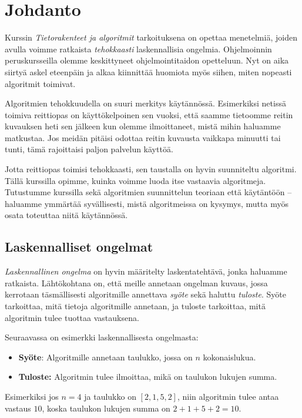 \chapter{Johdanto}

Kurssin \emph{Tietorakenteet ja algoritmit} tarkoituksena
on opettaa menetelmiä, joiden avulla voimme ratkaista
\emph{tehokkaasti} laskennallisia ongelmia.
Ohjelmoinnin peruskursseilla olemme keskittyneet
ohjelmointitaidon opetteluun.
Nyt on aika siirtyä askel eteenpäin ja alkaa kiinnittää
huomiota myös siihen, miten nopeasti algoritmit toimivat.

Algoritmien tehokkuudella on suuri merkitys käytännössä.
Esimerkiksi netissä toimiva reittiopas on käyttökelpoinen sen vuoksi,
että saamme tietoomme reitin kuvauksen heti sen jälkeen kun olemme
ilmoittaneet, mistä mihin haluamme matkustaa.
Jos meidän pitäisi odottaa reitin kuvausta vaikkapa minuutti tai tunti,
tämä rajoittaisi paljon palvelun käyttöä.

Jotta reittiopas toimisi tehokkaasti, sen taustalla on
hyvin suunniteltu algoritmi.
Tällä kurssilla opimme, kuinka voimme luoda itse vastaavia algoritmeja.
Tutustumme kurssilla sekä algoritmien suunnittelun teoriaan että
käytäntöön -- haluamme ymmärtää syvällisesti, mistä algoritmeissa on kysymys,
mutta myös osata toteuttaa niitä käytännössä.

\section{Laskennalliset ongelmat}

\emph{Laskennallinen ongelma} on hyvin määritelty laskentatehtävä,
jonka haluamme ratkaista.
Lähtökohtana on, että meille annetaan ongelman kuvaus,
jossa kerrotaan täsmällisesti algoritmille annettava
\emph{syöte} sekä haluttu \emph{tuloste}.
Syöte tarkoittaa, mitä tietoja algoritmille annetaan,
ja tuloste tarkoittaa, mitä algoritmin tulee tuottaa vastauksena.

Seuraavassa on esimerkki laskennallisesta ongelmasta:

\begin{itemize}
\item \textbf{Syöte}: Algoritmille annetaan taulukko,
jossa on $n$ kokonaislukua.
\item \textbf{Tuloste:} Algoritmin tulee ilmoittaa,
mikä on taulukon lukujen summa.
\end{itemize}

Esimerkiksi jos $n=4$ ja taulukko on $[2,1,5,2]$,
niin algoritmin tulee antaa vastaus $10$,
koska taulukon lukujen summa on $2+1+5+2=10$.

